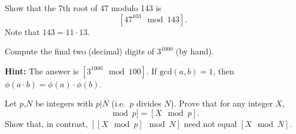 \documentclass[a4paper,10pt,landscape,twocolumn]{scrartcl}
\begin{document}
\problems

\begin{exercise}
\begin{subex}
Show that the 7th root of 47 modulo 143 is $$[47^{103} \mod 143].$$ Note that $143=11\cdot 13$.
\end{subex}

\begin{subex}
Compute the final two (decimal) digits of $3^{1000}$ (by hand).

\textbf{Hint:} The answer is $[3^{1000} \mod 100]$. If $\text{gcd}(a,b)=1$, then $\phi(a\cdot b)=\phi(a)\cdot\phi(b)$.
\end{subex}

\begin{subex}
Let $p$,$N$ be integers with $p|N$ (i.e.\ $p$ divides $N$). Prove that for any integer $X$,
\begin{equation*}
[[X \mod N]\mod p]=[X \mod p].
\end{equation*}
Show that, in contrast, $[[X \mod p]\mod N]$ need not equal $[X\mod N]$.
\end{subex}

\end{exercise}


%


\end{document}
